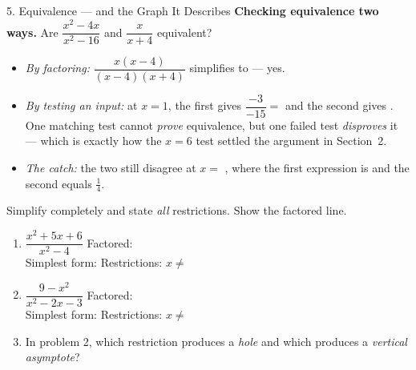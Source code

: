 \documentclass[10pt]{article}
\begin{document}
\begin{notesbox}{5. Equivalence --- and the Graph It Describes}
\vspace{3pt}
\textbf{Checking equivalence two ways.} Are $\dfrac{x^2-4x}{x^2-16}$ and $\dfrac{x}{x+4}$ equivalent?
\begin{itemize}[leftmargin=1.5em, itemsep=3pt]
  \item \emph{By factoring:} $\dfrac{x(x-4)}{(x-4)(x+4)}$ simplifies to \blank{1.6cm} --- yes.
  \item \emph{By testing an input:} at $x=1$, the first gives $\dfrac{-3}{-15}=$ \blank{0.8cm} and the
        second gives \blank{0.8cm}. One matching test cannot \emph{prove} equivalence, but one failed
        test \emph{disproves} it --- which is exactly how the $x=6$ test settled the argument in
        Section~2.
  \item \emph{The catch:} the two still disagree at $x=$ \blank{0.8cm}, where the first expression is
        \blank{2.4cm} and the second equals $\tfrac14$.
\end{itemize}
\end{notesbox}

\begin{practicebox}
Simplify completely and state \emph{all} restrictions. Show the factored line.

\vspace{3pt}
\begin{enumerate}[leftmargin=1.7em, itemsep=8pt]
  \item $\dfrac{x^2+5x+6}{x^2-4}$ \hfill Factored: \blank{4.2cm} \\[4pt]
        Simplest form: \blank{2.6cm} \quad Restrictions: $x\neq$ \blank{2.2cm}
  \item $\dfrac{9-x^2}{x^2-2x-3}$ \hfill Factored: \blank{4.2cm} \\[4pt]
        Simplest form: \blank{2.6cm} \quad Restrictions: $x\neq$ \blank{2.2cm}
  \item In problem 2, which restriction produces a \emph{hole} and which produces a \emph{vertical
        asymptote}? \blank{5.6cm}
\end{enumerate}
\end{practicebox}
\end{document}
